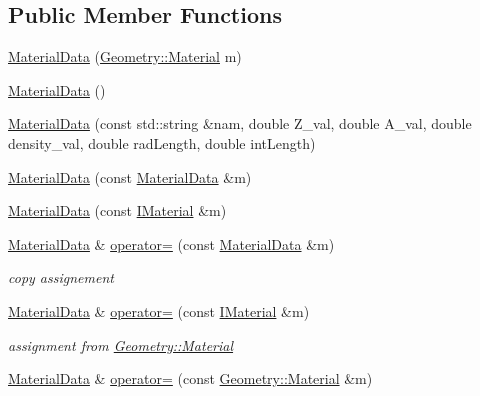 \subsection*{Public Member Functions}
\begin{DoxyCompactItemize}
\item 
\hyperlink{class_d_d4hep_1_1_d_d_rec_1_1_material_data_a13401e43c53f525dc9adc6b497c6f0e6}{MaterialData} (\hyperlink{class_d_d4hep_1_1_geometry_1_1_material}{Geometry::Material} m)
\item 
\hyperlink{class_d_d4hep_1_1_d_d_rec_1_1_material_data_ae227988b42f40660dd9d59e0caecb1ef}{MaterialData} ()
\item 
\hyperlink{class_d_d4hep_1_1_d_d_rec_1_1_material_data_adff4c3a5132ae55171ed9801b107d5fe}{MaterialData} (const std::string \&nam, double Z\_\-val, double A\_\-val, double density\_\-val, double radLength, double intLength)
\item 
\hyperlink{class_d_d4hep_1_1_d_d_rec_1_1_material_data_acd85ff17497787b8da9cf855d56cb663}{MaterialData} (const \hyperlink{class_d_d4hep_1_1_d_d_rec_1_1_material_data}{MaterialData} \&m)
\item 
\hyperlink{class_d_d4hep_1_1_d_d_rec_1_1_material_data_afc8ce700606b7690b0f86ba6e9db3787}{MaterialData} (const \hyperlink{class_d_d_surfaces_1_1_i_material}{IMaterial} \&m)
\item 
\hyperlink{class_d_d4hep_1_1_d_d_rec_1_1_material_data}{MaterialData} \& \hyperlink{class_d_d4hep_1_1_d_d_rec_1_1_material_data_af4fcb3ac628a39c87c895bcb478ac30d}{operator=} (const \hyperlink{class_d_d4hep_1_1_d_d_rec_1_1_material_data}{MaterialData} \&m)
\begin{DoxyCompactList}\small\item\em copy assignement \item\end{DoxyCompactList}\item 
\hyperlink{class_d_d4hep_1_1_d_d_rec_1_1_material_data}{MaterialData} \& \hyperlink{class_d_d4hep_1_1_d_d_rec_1_1_material_data_a7340be27bee4c64179f6114d698c7f65}{operator=} (const \hyperlink{class_d_d_surfaces_1_1_i_material}{IMaterial} \&m)
\begin{DoxyCompactList}\small\item\em assignment from \hyperlink{class_d_d4hep_1_1_geometry_1_1_material}{Geometry::Material} \item\end{DoxyCompactList}\item 
\hyperlink{class_d_d4hep_1_1_d_d_rec_1_1_material_data}{MaterialData} \& \hyperlink{class_d_d4hep_1_1_d_d_rec_1_1_material_data_acd13fcfbed46538127af9d018960e906}{operator=} (const \hyperlink{class_d_d4hep_1_1_geometry_1_1_material}{Geometry::Material} \&m)

\end{DoxyCompactItemize}

